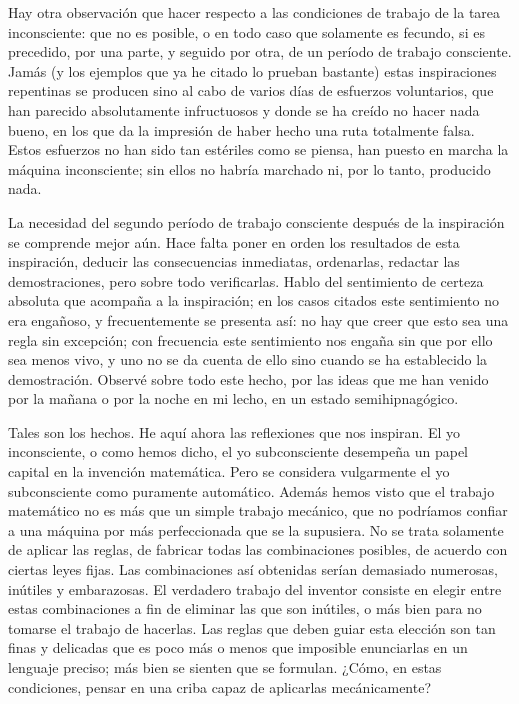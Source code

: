 \documentclass[a4paper, 12pt, draft]{article}
\begin{document}
Hay otra observación que hacer respecto a las condiciones de trabajo de
la tarea inconsciente: que no es posible, o en todo caso que solamente es
fecundo, si es precedido, por una parte, y seguido por otra, de un período de trabajo consciente. Jamás (y los ejemplos que ya he citado lo
prueban bastante) estas inspiraciones repentinas se producen sino al cabo de
varios días de esfuerzos voluntarios, que han parecido absolutamente
infructuosos y donde se ha creído no hacer nada bueno, en los que da la
impresión de haber hecho una ruta totalmente falsa. Estos esfuerzos no
han sido tan estériles como se piensa, han puesto en marcha la máquina inconsciente; sin ellos no habría marchado ni, por lo tanto,
producido nada.

La necesidad del segundo período de trabajo consciente después de
la inspiración se comprende mejor aún. Hace falta poner en orden los
resultados de esta inspiración, deducir las consecuencias inmediatas,
ordenarlas, redactar las demostraciones, pero sobre todo verificarlas. Hablo
del sentimiento de certeza absoluta que acompaña a la inspiración;
en los casos citados este sentimiento no era engañoso, y frecuentemente
se presenta así: no hay que creer que esto sea una regla sin excepción; con frecuencia este sentimiento nos engaña sin que por ello sea
menos vivo, y uno no se da cuenta de ello
sino cuando se ha establecido la demostración. Observé sobre todo
este hecho, por las ideas que me han venido por la mañana o por la
noche en mi lecho, en un estado semihipnagógico.

Tales son los hechos. He aquí ahora las reflexiones que nos inspiran.
El yo inconsciente, o como hemos dicho, el yo subconsciente desempeña un
papel capital en la invención matemática. Pero se considera
vulgarmente el yo subconsciente como puramente automático. Además
hemos visto que el trabajo matemático no es más que un simple
trabajo mecánico, que no podríamos confiar a una máquina por más perfeccionada que se la supusiera. No se trata solamente de aplicar
las reglas, de fabricar todas las combinaciones posibles, de acuerdo con
ciertas leyes fijas. Las combinaciones así obtenidas serían demasiado
numerosas, inútiles y embarazosas. El verdadero trabajo del inventor
consiste en elegir entre estas combinaciones a fin de eliminar las que son inútiles, o más bien para no tomarse el trabajo de hacerlas. Las
reglas que deben guiar esta elección son tan finas y delicadas que es
poco más o menos que imposible enunciarlas en un lenguaje preciso; más bien se sienten que se formulan. ¿Cómo, en estas condiciones,
pensar en una criba capaz de aplicarlas mecánicamente?
\end{document}
